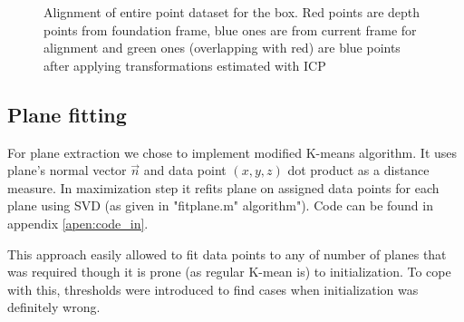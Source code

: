 \documentclass{article}
\begin{document}
\begin{figure}[h!]
    \centering
      \caption{Alignment of entire point dataset for the box. Red points are depth points from
      foundation frame, blue ones are from current frame for alignment and green ones (overlapping with red)
      are blue points after applying transformations estimated with ICP}
\end{figure}
\subsection{Plane fitting}
For plane extraction we chose to implement modified K-means algorithm.
It uses plane's normal vector $\vec{n}$  and data point $ (x,y,z) $
dot product as a distance measure. In maximization step it refits
plane on assigned data points for each plane
 using SVD (as given in "fitplane.m"
algorithm"). Code can be found in appendix \ref{apen:code_in}.

This approach easily allowed to fit data points to any of number of
planes that was required though it is prone (as regular K-mean is)
to initialization. To cope with this, thresholds were introduced
to find cases when initialization was definitely wrong.
\end{document}
